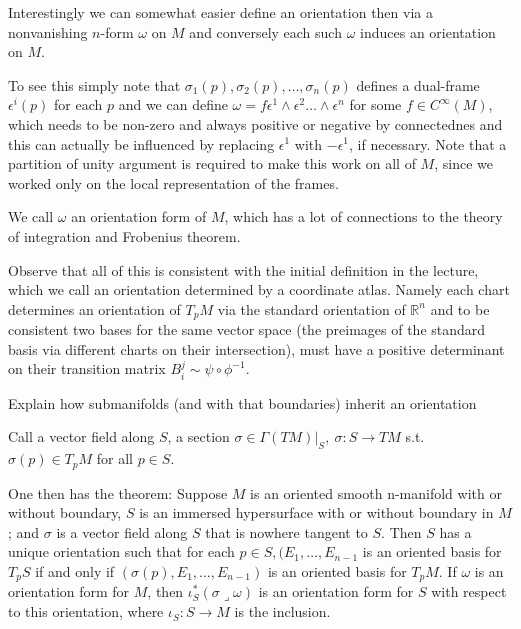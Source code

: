 Interestingly we can somewhat easier define an orientation then via a nonvanishing \( n \)-form \( \omega \) on \( M \)
and conversely each such \( \omega \) induces an orientation on \( M \).

To see this simply note that \( \sigma_1(p), \sigma_2(p), \dots, \sigma_n(p) \) defines a dual-frame
\( \epsilon^i(p) \) for each \( p \) and we can define \( \omega = f \epsilon^1 \wedge \epsilon^2 \dots \wedge \epsilon^n \)
for some \( f \in C^\infty(M) \), which needs to be non-zero and always positive or negative by connectednes and this can actually be influenced
by replacing \( \epsilon^1 \) with \( - \epsilon^1 \), if necessary. Note that a partition of unity argument is required to make this work
on all of \( M \), since we worked only on the local representation of the frames.

We call \( \omega \) an orientation form of \( M \), which has a lot of connections 
to the theory of integration and Frobenius theorem.

Observe that all of this is consistent with the initial definition in the lecture, which we call
an orientation determined by a coordinate atlas. Namely each chart determines an orientation of \( T_pM \)
via the standard orientation of \( \mathbb{R}^n \) and to be consistent two bases for the same vector space
(the preimages of the standard basis via different charts on their intersection), must have a positive determinant
on their transition matrix \( B^j_i \sim \psi \circ \phi^{-1} \).

Explain how submanifolds (and with that boundaries) inherit an orientation

Call a vector field along \( S \), a section \( \sigma \in \Gamma(TM)|_S,\ \sigma : S \to TM \)
s.t. \( \sigma(p) \in T_p M \) for all \( p \in S \).

One then has the theorem:
Suppose \( M \) is an oriented smooth n-manifold with or without
boundary, \( S \) is an immersed hypersurface with or without boundary in \( M \); and \( \sigma \) is
a vector field along \( S \) that is nowhere tangent to \( S \). Then \( S \) has a unique orientation
such that for each \( p \in S, (E_1, \dots, E_{n-1} \) is an oriented basis for \( T_pS \) if and only if
\( (\sigma(p), E_1, \dots, E_{n-1}) \) is an oriented basis for \( T_p M \). If \( \omega \) is an orientation form for \( M \),
then \( \iota^\ast_S(\sigma \lrcorner\omega) \) is an orientation form for \( S \) with respect to this orientation, where
\( \iota_S : S \to M \) is the inclusion.

